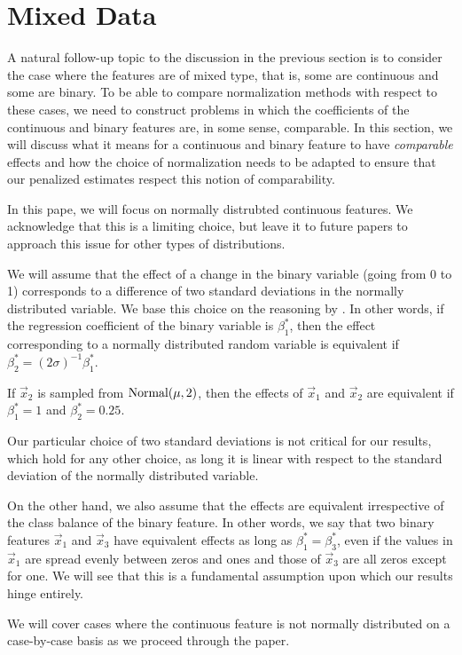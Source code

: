 \section{Mixed Data}
\label{sec:mixed-data}

A natural follow-up topic to the discussion in the previous section is to consider the case where the features are of mixed type, that is, some are continuous and some are binary.
To be able to compare normalization methods with respect to these cases, we need to construct problems in which the coefficients of the continuous and binary features are, in some sense, comparable.
In this section, we will discuss what it means for a continuous and binary feature to have \emph{comparable} effects and how the choice of normalization needs to be adapted to ensure that our penalized estimates respect this notion of comparability.

In this pape, we will focus on normally distrubted continuous features. We acknowledge that this is a limiting choice, but leave it to future papers to approach this issue for other types of distributions.

We will assume that the effect of a change in the binary variable (going from 0 to 1) corresponds to a difference of two standard deviations in the normally distributed variable. We base this choice on the reasoning by \textcite{gelman2008}. In other words, if the regression coefficient of the binary variable is \(\beta^*_1\), then the effect corresponding to a normally distributed random variable is equivalent if \(\beta^*_2 = (2\sigma)^{-1} \beta_1^*\).

\begin{example}
  If \(\vec{x}_2\) is sampled from \(\operatorname{Normal}(\mu, 2)\), then the effects of \(\vec{x}_1\) and \(\vec{x}_2\) are equivalent if \(\beta_1^* = 1\) and \(\beta_2^* = 0.25\).
\end{example}

Our particular choice of two standard deviations is not critical for our results, which hold for any other choice, as long it is linear with respect to the standard deviation of the normally distributed variable.

On the other hand, we also assume that the effects are equivalent irrespective of the class balance of the binary feature. In other words, we say that two binary features \(\vec{x}_1\) and \(\vec{x}_3\) have equivalent effects as long as \(\beta_1^* = \beta_3^*\), even if the values in \(\vec{x}_1\) are spread evenly between zeros and ones and those of \(\vec{x}_3\) are all zeros except for one. We will see that this is a fundamental assumption upon which our results hinge entirely.

We will cover cases where the continuous feature is not normally distributed on a case-by-case basis as we proceed through the paper.


